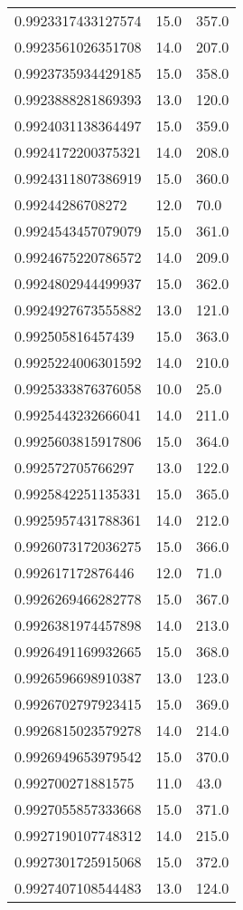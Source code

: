 \begin{center}
\begin{supertabular}[H]{p{0.30\textwidth}p{0.05\textwidth}p{0.05\textwidth}}
0.9923317433127574 & 15.0 & 357.0 \\ 
0.9923561026351708 & 14.0 & 207.0 \\ 
0.9923735934429185 & 15.0 & 358.0 \\ 
0.9923888281869393 & 13.0 & 120.0 \\ 
0.9924031138364497 & 15.0 & 359.0 \\ 
0.9924172200375321 & 14.0 & 208.0 \\ 
0.9924311807386919 & 15.0 & 360.0 \\ 
0.99244286708272 & 12.0 & 70.0 \\ 
0.9924543457079079 & 15.0 & 361.0 \\ 
0.9924675220786572 & 14.0 & 209.0 \\ 
0.9924802944499937 & 15.0 & 362.0 \\ 
0.9924927673555882 & 13.0 & 121.0 \\ 
0.992505816457439 & 15.0 & 363.0 \\ 
0.9925224006301592 & 14.0 & 210.0 \\ 
0.9925333876376058 & 10.0 & 25.0 \\ 
0.9925443232666041 & 14.0 & 211.0 \\ 
0.9925603815917806 & 15.0 & 364.0 \\ 
0.992572705766297 & 13.0 & 122.0 \\ 
0.9925842251135331 & 15.0 & 365.0 \\ 
0.9925957431788361 & 14.0 & 212.0 \\ 
0.9926073172036275 & 15.0 & 366.0 \\ 
0.992617172876446 & 12.0 & 71.0 \\ 
0.9926269466282778 & 15.0 & 367.0 \\ 
0.9926381974457898 & 14.0 & 213.0 \\ 
0.9926491169932665 & 15.0 & 368.0 \\ 
0.9926596698910387 & 13.0 & 123.0 \\ 
0.9926702797923415 & 15.0 & 369.0 \\ 
0.9926815023579278 & 14.0 & 214.0 \\ 
0.9926949653979542 & 15.0 & 370.0 \\ 
0.992700271881575 & 11.0 & 43.0 \\ 
0.9927055857333668 & 15.0 & 371.0 \\ 
0.9927190107748312 & 14.0 & 215.0 \\ 
0.9927301725915068 & 15.0 & 372.0 \\ 
0.9927407108544483 & 13.0 & 124.0 \\ 

\end{supertabular}
\end{center}
